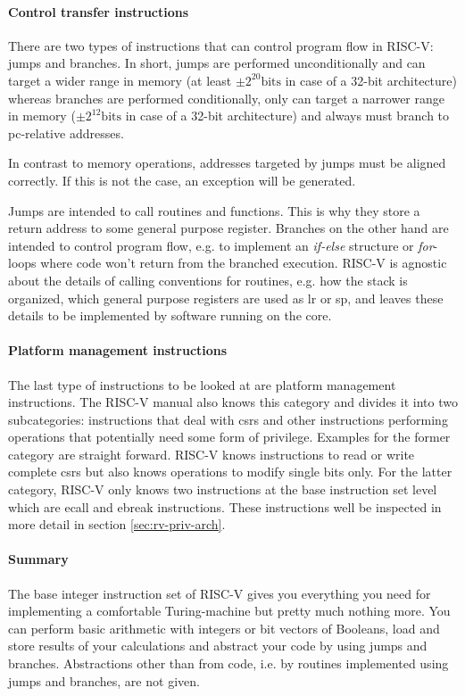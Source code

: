 \paragraph{Control transfer instructions}
There are two types of instructions that can control program flow in RISC-V: jumps and branches.
In short, jumps are performed unconditionally and can target a wider range in memory (at least $ \pm 2^{20}\text{bits} $ in case of a 32-bit architecture) whereas branches are performed conditionally, only can target a narrower range in memory ($ \pm 2^{12}\text{bits} $ in case of a 32-bit architecture) and always must branch to \gls{pc}-relative addresses.

In contrast to memory operations, addresses targeted by jumps must be aligned correctly.
If this is not the case, an exception will be generated.

Jumps are intended to call routines and functions.
This is why they store a return address to some general purpose register.
Branches on the other hand are intended to control program flow, e.g. to implement an \textit{if-else} structure or \textit{for}-loops where code won't return from the branched execution.
RISC-V is agnostic about the details of calling conventions for routines, e.g. how the stack is organized, which general purpose registers are used as \gls{lr} or \gls{sp}, and leaves these details to be implemented by software running on the core.

\paragraph{Platform management instructions}
The last type of instructions to be looked at are platform management instructions.
The RISC-V manual also knows this category and divides it into two subcategories: instructions that deal with \glspl{csr} and other instructions performing operations that potentially need some form of privilege.
Examples for the former category are straight forward.
RISC-V knows instructions to read or write complete \glspl{csr} but also knows operations to modify single bits only.
For the latter category, RISC-V only knows two instructions at the base instruction set level which are \gls{ecall} and \gls{ebreak} instructions.
These instructions well be inspected in more detail in section \ref{sec:rv-priv-arch}.

\paragraph{Summary}
The base integer instruction set of RISC-V gives you everything you need for implementing a comfortable Turing-machine but pretty much nothing more.
You can perform basic arithmetic with integers or bit vectors of Booleans, load and store results of your calculations and abstract your code by using jumps and branches.
Abstractions other than from code, i.e. by routines implemented using jumps and branches, are not given.

